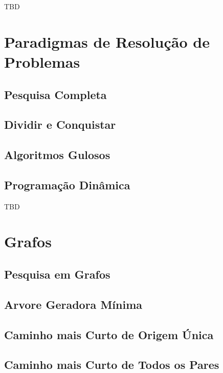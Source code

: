 \documentclass[11pt]{scrartcl}
\begin{document}
TBD

\section{Paradigmas de Resolução de Problemas}

\subsection{Pesquisa Completa}

\subsection{Dividir e Conquistar}

\subsection{Algoritmos Gulosos}

\subsection{Programação Dinâmica}

TBD


\section{Grafos}

\subsection{Pesquisa em Grafos}

\subsection{Arvore Geradora Mínima}

\subsection{Caminho mais Curto de Origem Única}

\subsection{Caminho mais Curto de Todos os Pares}
\end{document}
